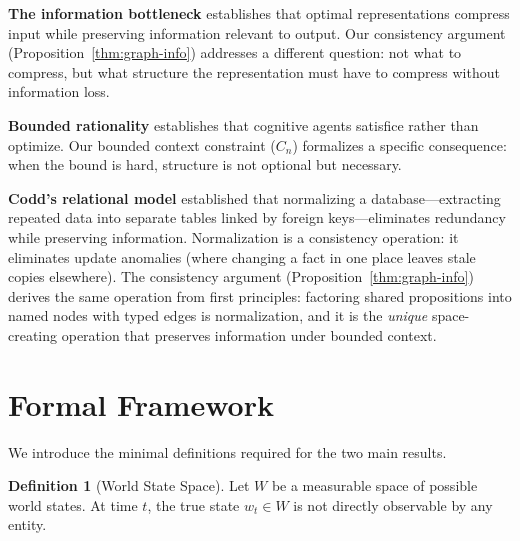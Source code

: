 \documentclass[11pt]{article}
\theoremstyle{definition}
\newtheorem{definition}{Definition}
\begin{document}
\textbf{The information bottleneck} \cite{Tishby2000} establishes that
optimal representations compress input while preserving information
relevant to output. Our consistency argument
(Proposition~\ref{thm:graph-info}) addresses a different question: not what
to compress, but what structure the representation must have to compress
without information loss.

\textbf{Bounded rationality} \cite{Simon1955} establishes that cognitive
agents satisfice rather than optimize. Our bounded context constraint
($C_n$) formalizes a specific consequence: when the bound is hard,
structure is not optional but necessary.

\textbf{Codd's relational model} \cite{Codd1970} established that normalizing
a database---extracting repeated data into separate tables linked by
foreign keys---eliminates redundancy while preserving information.
Normalization is a consistency operation: it eliminates update anomalies
(where changing a fact in one place leaves stale copies elsewhere).
The consistency argument (Proposition~\ref{thm:graph-info})
derives the same operation from first principles: factoring
shared propositions into named nodes with typed edges is normalization,
and it is the \emph{unique} space-creating operation that preserves
information under bounded context.

\section{Formal Framework}
\label{sec:framework}

We introduce the minimal definitions required for the two main results.

\begin{definition}[World State Space]
\label{def:world}
Let $W$ be a measurable space of possible world states. At time $t$, the
true state $w_t \in W$ is not directly observable by any entity.
\end{definition}
\end{document}
